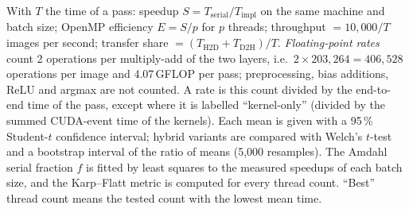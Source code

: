 With $T$ the time of a pass: speedup $S=T_{\mathrm{serial}}/T_{\mathrm{impl}}$ on the same machine and batch size; OpenMP efficiency $E=S/p$ for $p$ threads; throughput $=10{,}000/T$ images per second; transfer share $=(T_{\mathrm{H2D}}+T_{\mathrm{D2H}})/T$. \emph{Floating-point rates} count 2 operations per multiply-add of the two layers, i.e.\ $2\times203{,}264=406{,}528$ operations per image and 4.07\,GFLOP per pass; preprocessing, bias additions, ReLU and argmax are not counted. A rate is this count divided by the end-to-end time of the pass, except where it is labelled ``kernel-only'' (divided by the summed CUDA-event time of the kernels). Each mean is given with a 95\,\% Student-$t$ confidence interval; hybrid variants are compared with Welch's $t$-test and a bootstrap interval of the ratio of means (5{,}000 resamples). The Amdahl serial fraction $f$ is fitted by least squares to the measured speedups of each batch size, and the Karp--Flatt metric is computed for every thread count. ``Best'' thread count means the tested count with the lowest mean time.
